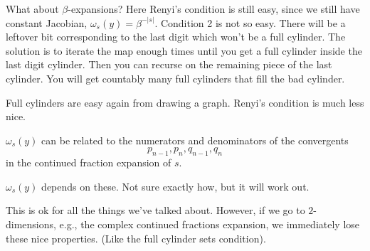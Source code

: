 \documentclass{article}
\begin{document}
\begin{example}
What about $\beta$-expansions?
Here Renyi's condition is still easy, since we still
have constant Jacobian, $\omega_s(y) = \beta^{-|s|}$.
Condition 2 is not so easy. There will be a leftover 
bit corresponding to the last digit 
which won't be a full cylinder. The solution is 
to iterate the map enough times until you get a 
full cylinder inside the last digit cylinder.
Then you can recurse on the remaining piece 
of the last cylinder. You will get countably 
many full cylinders that fill the bad cylinder.
\end{example}

\begin{example}[RCF]
    Full cylinders are easy again from drawing a 
    graph. Renyi's condition is much less nice.

    $\omega_s(y)$ can be related to the numerators
    and denominators of the convergents
    \[p_{n-1},p_n,q_{n-1},q_n\]
    in the continued fraction expansion of $s$.

    $\omega_s(y)$ depends on these.
    Not sure exactly how, but it will work out.
\end{example}

This is ok for all the things we've talked about.
However, if we go to $2$-dimensions, e.g., the 
complex continued fractions expansion, 
we immediately lose these nice properties.
(Like the full cylinder sets condition).
\end{document}
